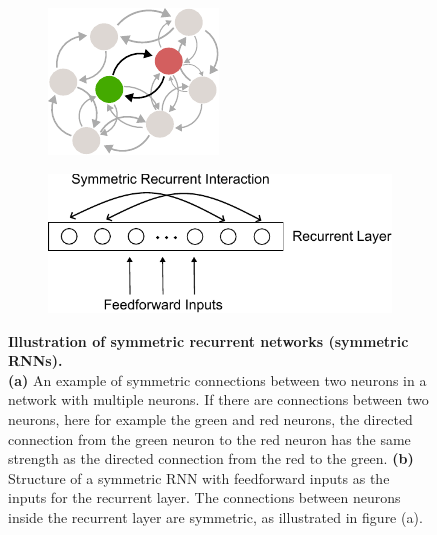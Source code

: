 \documentclass[11pt]{article}
\begin{document}
		\begin{figure}[H] 
			\begin{subfigure}[b]{0.4\textwidth}
				\centering
				\includegraphics[width=0.2\textheight]{../figures/sym_net.pdf}
				\vspace{0.2cm}
				\caption{}
			\end{subfigure}
			\hspace{0.4cm}
			\begin{subfigure}[b]{0.4\textwidth}
				\centering
				\includegraphics[width=0.4\textheight]{../figures/sym_recurrent.pdf}
				\caption{}
			\end{subfigure}
		\caption{\textbf{Illustration of symmetric recurrent networks (symmetric RNNs).} \\ \textbf{(a)} An example of symmetric connections between two neurons in a network with multiple neurons. If there are connections between two neurons, here for example the green and red neurons, the directed connection from the green neuron to the red neuron has the same strength as the directed connection from the red to the green. \textbf{(b)} Structure of a symmetric RNN with feedforward inputs as the inputs for the recurrent layer. The connections between neurons inside the recurrent layer are symmetric, as illustrated in figure (a).}
		\label{fig:symmetric_RNN}
		\end{figure}
	
\end{document}
